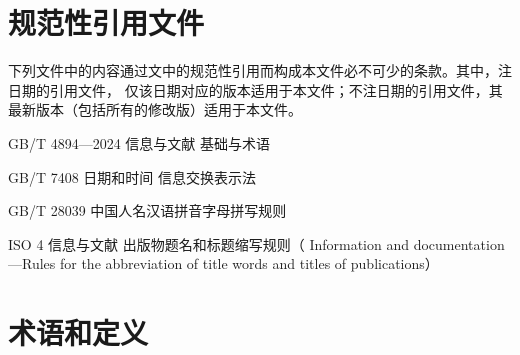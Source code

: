 \documentclass[twoside]{article}%
\begin{document}
\section{规范性引用文件}

下列文件中的内容通过文中的规范性引用而构成本文件必不可少的条款。其中，注日期的引用文件，
仅该日期对应的版本适用于本文件；不注日期的引用文件，其最新版本（包括所有的修改版）适用于本文件。

GB/T 4894—2024 信息与文献 基础与术语

GB/T 7408 日期和时间 信息交换表示法

GB/T 28039 中国人名汉语拼音字母拼写规则

ISO 4 信息与文献 出版物题名和标题缩写规则（ Information and documentation—Rules for the
abbreviation of title words and titles of publications）

\section{术语和定义}
\end{document}
